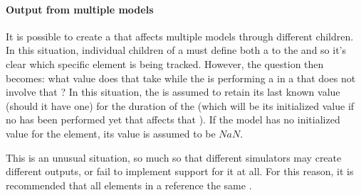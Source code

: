 \begin{blockChanged}
\paragraph*{Output from multiple models}
\label{sec:multiModelOutput}
It is possible to create a \RepeatedTask that affects multiple models through different \SubTask children.  In this situation, individual \Variable children of a \DataGenerator must define both a  to the \RepeatedTask and  so it's clear which specific element is being tracked.  However, the question then becomes: what value does that \Variable take while the \RepeatedTask is performing a \Simulation in a \SubTask that does not involve that \Model?  In this situation, the \Variable is assumed to retain its last known value (should it have one) for the duration of the \Simulation (which will be its initialized value if no \Simulation has been performed yet that affects that \Variable).  If the model has no initialized value for the element, its value is assumed to be $NaN$.

This is an unusual situation, so much so that different simulators may create different outputs, or fail to implement support for it at all.  For this reason, it is recommended that all \SubTask elements in a \RepeatedTask reference the same \Model.


\end{blockChanged}



